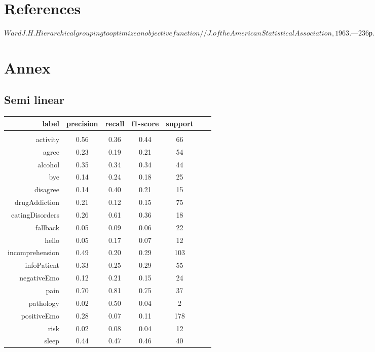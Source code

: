 \documentclass[11pt]{article}
\begin{document}
\section{References}


$ Ward J.H. Hierarchical grouping to optimize an objective function // J. of the American Statistical Association, 1963. — 236 р. $

\section{Annex}

\subsection{Semi linear}
\begin{table}[htb]
\begin{center}
\begin{tabular}{ |r|c|c|c|c|c|c| }
\hline
label 			& precision & recall & f1-score & support\\ \hline 
\\ \hline 
activity 		&  0.56 & 0.36 & 0.44 &   66\\ \hline 
agree 			&  0.23 & 0.19 & 0.21 &   54\\ \hline 
alcohol 		&  0.35 & 0.34 & 0.34 &   44\\ \hline 
bye 			&  0.14 & 0.24 & 0.18 &   25\\ \hline 
disagree 		&  0.14 & 0.40 & 0.21 &   15\\ \hline 
drugAddiction 	&  0.21 & 0.12 & 0.15 &   75\\ \hline 
eatingDisorders &  0.26 & 0.61 & 0.36 &   18\\ \hline 
fallback 		&  0.05 & 0.09 & 0.06 &   22\\ \hline 
hello 			&  0.05 & 0.17 & 0.07 &   12\\ \hline 
incomprehension &  0.49 & 0.20 & 0.29 &  103\\ \hline 
infoPatient 	&  0.33 & 0.25 & 0.29 &   55\\ \hline 
negativeEmo 	&  0.12 & 0.21 & 0.15 &   24\\ \hline 
pain 			&  0.70 & 0.81 & 0.75 &   37\\ \hline 
pathology 		&  0.02 & 0.50 & 0.04 &    2\\ \hline 
positiveEmo 	&  0.28 & 0.07 & 0.11 &  178\\ \hline 
risk 			&  0.02 & 0.08 & 0.04 &   12\\ \hline 
sleep 			&  0.44 & 0.47 & 0.46 &   40\\ \hline 

\end{tabular}
\end{center}
\end{table}
\end{document}
